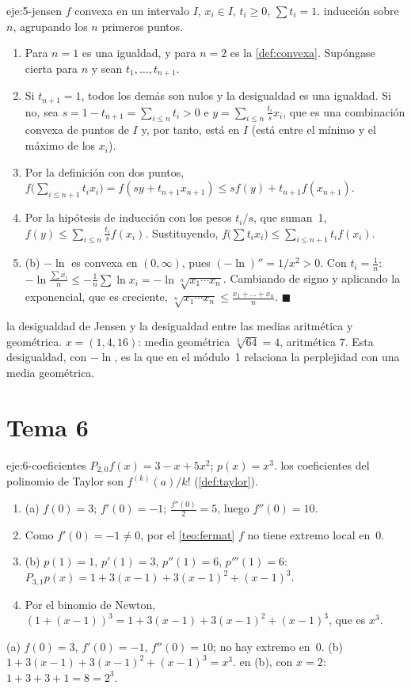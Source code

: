 \begin{solucion}{eje:5-jensen}
\datos $f$ convexa en un intervalo $I$, $x_i\in I$, $t_i\ge0$, $\sum t_i=1$.
\planteamiento inducción sobre $n$, agrupando los $n$ primeros puntos.
\pasos
\begin{enumerate}[label=\arabic*.]
  \item Para $n=1$ es una igualdad, y para $n=2$ es la \cref{def:convexa}. Supóngase cierta para $n$ y sean $t_1,\dots,t_{n+1}$.
  \item Si $t_{n+1}=1$, todos los demás son nulos y la desigualdad es una igualdad. Si no, sea $s=1-t_{n+1}=\sum_{i\le n}t_i>0$ e $y=\sum_{i\le n}\frac{t_i}{s}x_i$, que es una combinación convexa de puntos de $I$ y, por tanto, está en $I$ (está entre el mínimo y el máximo de los $x_i$).
  \item Por la definición con dos puntos, $f\bigl(\sum_{i\le n+1}t_ix_i\bigr)=f(sy+t_{n+1}x_{n+1})\le sf(y)+t_{n+1}f(x_{n+1})$.
  \item Por la hipótesis de inducción con los pesos $t_i/s$, que suman~1, $f(y)\le\sum_{i\le n}\frac{t_i}{s}f(x_i)$. Sustituyendo, $f\bigl(\sum t_ix_i\bigr)\le\sum_{i\le n+1}t_if(x_i)$.
  \item (b) $-\ln$ es convexa en $(0,\infty)$, pues $(-\ln)''=1/x^{2}>0$. Con $t_i=\frac1n$: $-\ln\frac{\sum x_i}{n}\le-\frac1n\sum\ln x_i=-\ln\sqrt[n]{x_1\cdots x_n}$. Cambiando de signo y aplicando la exponencial, que es creciente, $\sqrt[n]{x_1\cdots x_n}\le\frac{x_1+\dots+x_n}{n}$. \hfill$\blacksquare$
\end{enumerate}
\resultado la desigualdad de Jensen y la desigualdad entre las medias aritmética y geométrica.
\comprobacion $x=(1,4,16)$: media geométrica $\sqrt[3]{64}=4$, aritmética $7$. Esta desigualdad, con $-\ln$, es la que en el módulo~1 relaciona la perplejidad con una media geométrica.
\end{solucion}
\section{Tema 6}

\begin{solucion}{eje:6-coeficientes}
\datos $P_{2,0}f(x)=3-x+5x^{2}$; $p(x)=x^{3}$.
\planteamiento los coeficientes del polinomio de Taylor son $f^{(k)}(a)/k!$ (\cref{def:taylor}).
\pasos
\begin{enumerate}[label=\arabic*.]
  \item (a) $f(0)=3$; $f'(0)=-1$; $\frac{f''(0)}{2}=5$, luego $f''(0)=10$.
  \item Como $f'(0)=-1\ne0$, por el \cref{teo:fermat} $f$ no tiene extremo local en~0.
  \item (b) $p(1)=1$, $p'(1)=3$, $p''(1)=6$, $p'''(1)=6$: $P_{3,1}p(x)=1+3(x-1)+3(x-1)^{2}+(x-1)^{3}$.
  \item Por el binomio de Newton, $(1+(x-1))^{3}=1+3(x-1)+3(x-1)^{2}+(x-1)^{3}$, que es $x^{3}$.
\end{enumerate}
\resultado (a) $f(0)=3$, $f'(0)=-1$, $f''(0)=10$; no hay extremo en~0. (b) $1+3(x-1)+3(x-1)^{2}+(x-1)^{3}=x^{3}$.
\comprobacion en (b), con $x=2$: $1+3+3+1=8=2^{3}$.
\end{solucion}

